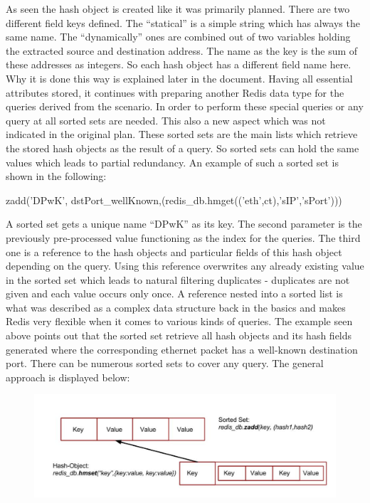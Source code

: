 As seen the hash object is created like it was primarily planned. There are two different field keys defined. The “statical” is a simple string which has always the same name. The “dynamically” ones are combined out of two variables holding the extracted source and destination address. The name as the key is the sum of these addresses as integers. So each hash object has a different field name here. Why it is done this way is explained later in the document. 
Having all essential attributes stored, it continues with preparing another Redis data type for the queries derived from the scenario. In order to perform these special queries or any query at all sorted sets are needed. This also a new aspect which was not indicated in the original plan. These sorted sets are the main lists which retrieve the stored hash objects as the result of a query. So sorted sets can hold the same values which leads to partial redundancy. An example of such a sorted set is shown in the following:\\

\begin{center}
zadd('DPwK', dstPort_wellKnown,(redis_db.hmget(('eth',ct),'sIP','sPort')))\\
\end{center}

A sorted set gets a unique name “DPwK” as its key. The second parameter is the previously pre-processed value functioning as the index for the queries. The third one is a reference to the hash objects and particular fields of this hash object depending on the query. Using this reference overwrites any already existing value in the sorted set which leads to natural filtering duplicates - duplicates are not given and each value occurs only once. A reference nested into a sorted list is what was described as a complex data structure back in the basics and makes Redis very flexible when it comes to various kinds of queries. The example seen above points out that the sorted set retrieve all hash objects and its hash fields generated where the corresponding ethernet packet has a well-known destination port. There can be numerous sorted sets to cover any query. The general approach is displayed below:

\begin{figure}[H]
	\centerline{\includegraphics[width=1.0\textwidth]{resources/solution3-2.png}}
\end{figure}

